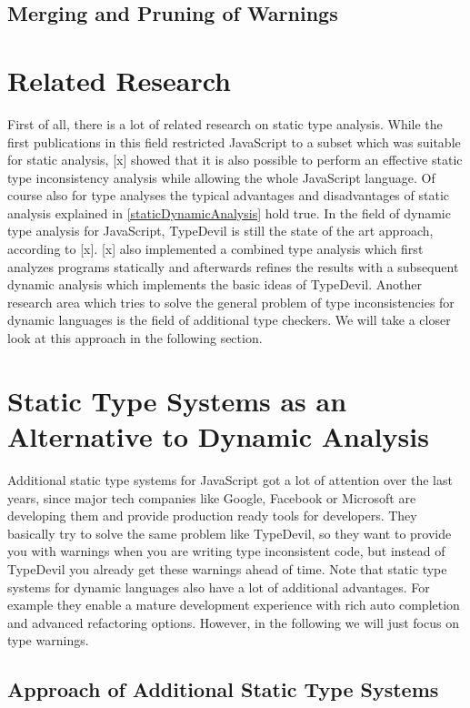 \documentclass[runningheads,a4paper]{llncs}
\begin{document}
\subsection{Merging and Pruning of Warnings}


\section{Related Research}

First of all, there is a lot of related research on static type analysis.
While the first publications in this field restricted JavaScript to a subset which was suitable for static analysis, [x] showed that it is also possible to perform an effective static type inconsistency analysis while allowing the whole JavaScript language.
Of course also for type analyses the typical advantages and disadvantages of static analysis explained in \ref{staticDynamicAnalysis} hold true.
In the field of dynamic type analysis for JavaScript, TypeDevil is still the state of the art approach, according to [x]. 
[x] also implemented a combined type analysis which first analyzes programs statically and afterwards refines the results with a subsequent dynamic analysis which implements the basic ideas of TypeDevil.
Another research area which tries to solve the general problem of type inconsistencies for dynamic languages is the field of additional type checkers.
We will take a closer look at this approach in the following section.

\section{Static Type Systems as an Alternative to Dynamic Analysis}

Additional static type systems for JavaScript got a lot of attention over the last years, since major tech companies like Google, Facebook or Microsoft are developing them and provide production ready tools for developers.
They basically try to solve the same problem like TypeDevil, so they want to provide you with warnings when you are writing type inconsistent code, but instead of TypeDevil you already get these warnings ahead of time.
Note that static type systems for dynamic languages also have a lot of additional advantages.
For example they enable a mature development experience with rich auto completion and advanced refactoring options.
However, in the following we will just focus on type warnings.

\subsection{Approach of Additional Static Type Systems} \label{staticTypeSystems}
\end{document}

